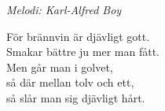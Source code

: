 {\footnotesize\textit{Melodi: Karl-Alfred Boy}}\par
\vspace{10pt}
För brännvin är djävligt gott.\\
Smakar bättre ju mer man fått.\\
Men går man i golvet,\\
så där mellan tolv och ett,\\
så slår man sig djävligt hårt.
